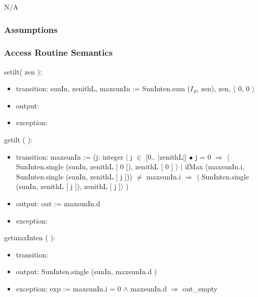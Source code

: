\documentclass[12pt, titlepage]{article}
\begin{document}
N/A

\subsubsection{Assumptions}



\subsubsection{Access Routine Semantics}

\noindent {} setilt( zen ):
\begin{itemize}
\item transition: sunIn, zenithL, maxsunIn := SunInten.sum ($I_{S}$, zen),   zen, $\langle$ 0, 0 $\rangle$
\item output: 
\item exception: 
\end{itemize}


\noindent {} getilt ( ):
\begin{itemize}
\item transition: maxsunIn := (j: integer $|$ j $\in$ [0.. $|$zenithL$|$]
  $\bullet$ j = 0 $\Rightarrow$  $\langle$ SunInten.single (sunIn, zenithL [ 0
  ]), zenithL [ 0 ] $\rangle$ $|$ ifMax (maxsunIn.i, SunInten.single (sunIn,
  zenithL [ j ])) $\neq$ maxsunIn.i $\Rightarrow$  $\langle$ SunInten.single
  (sunIn, zenithL [ j ]), zenithL [ j ]$\rangle$ ) 
 
\item output: out := maxsunIn.d
\item exception: 
\end{itemize}

\noindent getmaxInten ( ):
\begin{itemize}
\item transition:
\item output: SunInten.single (sunIn, maxsunIn.d )
\item exception: exp := maxsunIn.i = 0 $\wedge$ maxsunIn.d $\Rightarrow$ out\_empty
\end{itemize}
\end{document}

